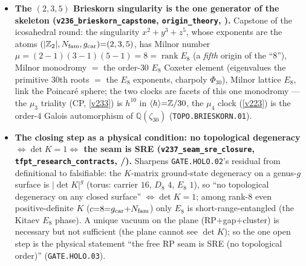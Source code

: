\begin{itemize}
  selection, now with holomorphy$\Leftrightarrow\det1$ a theorem (\texttt{GATE.HOLO.02}).
\item \textbf{The $(2,3,5)$ Brieskorn singularity is the one generator of the skeleton
  (\texttt{v236\_brieskorn\_capstone}, \texttt{origin\_theory}, \mE).} Capstone of the icosahedral round:
  the singularity $x^2{+}y^3{+}z^5$, whose exponents are the atoms $(|\mathbb{Z}_2|,N_{\mathrm{fam}},g_{\mathrm{car}}){=}(2,3,5)$, has
  Milnor number $\mu{=}(2{-}1)(3{-}1)(5{-}1){=}8{=}\operatorname{rank}E_8$ (a \emph{fifth} origin of the
  ``$8$''), Milnor monodromy $=$ the order-$30$ $E_8$ Coxeter element (eigenvalues the primitive $30$th
  roots $=$ the $E_8$ exponents, charpoly $\Phi_{30}$), Milnor lattice $E_8$, link the Poincar\'e sphere; the
  two clocks are facets of this one monodromy --- the $\mu_3$ triality (CP, \vref{v233}) is $h^{10}$ in
  $\langle h\rangle{=}\mathbb{Z}/30$, the $\mu_4$ clock (\vref{v223}) is the order-$4$ Galois automorphism of
  $\mathbb Q(\zeta_{30})$ (\texttt{TOPO.BRIESKORN.01}).
\item \textbf{The closing step as a physical condition: no topological degeneracy $\Leftrightarrow\det K{=}1
  \Leftrightarrow$ the seam is SRE (\texttt{v237\_seam\_sre\_closure}, \texttt{tfpt\_research\_contracts},
  \mE/\mO).} Sharpens \texttt{GATE.HOLO.02}'s residual from definitional to falsifiable: the $K$-matrix
  ground-state degeneracy on a genus-$g$ surface is $|\det K|^g$ (torus: carrier $16$, $D_8$ $4$, $E_8$ $1$),
  so ``no topological degeneracy on any closed surface'' $\Leftrightarrow\det K{=}1$; among rank-$8$ even
  positive-definite $K$ ($c{=}8{=}g_{\mathrm{car}}{+}N_{\mathrm{fam}}$) only $E_8$ is short-range-entangled (the Kitaev $E_8$
  phase). A unique vacuum on the plane (RP$+$gap$+$cluster) is necessary but not sufficient (the plane
  cannot see $\det K$); so the one open step is the physical statement ``the free RP seam is SRE (no
  topological order)'' (\texttt{GATE.HOLO.03}).
\end{itemize}


